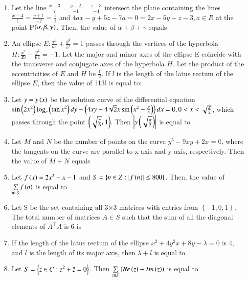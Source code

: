 \documentclass[journal]{IEEEtran}
\begin{document}
\begin{enumerate}
    \item Let the line $\frac{x-3}{7}=\frac{y-2}{-1}=\frac{z-3}{-4}$ intersect the plane containing the lines $\frac{x-4}{1}=\frac{y+1}{-2}=\frac{z}{1}$ and $4ax-y+5z-7a=0=2x-5y-z-3,a\in R$ at the point P$\left(\alpha,\beta,\gamma\right)$. Then, the value of $\alpha+\beta+\gamma$ equals

    \item An ellipse $E:\frac{x^2}{a^2}+\frac{y^2}{b^2}=1$ passes through the vertices of the hyperbola $H:\frac{x^2}{49}-\frac{y^2}{64}=-1$. Let the major and minor axes of the ellipse E coincide with the transverse and conjugate axes of the hyperbola $H$. Let the product of the eccentricities of $E$ and $H$ be $\frac{1}{2}$. If $l$ is the length of the latus rectum of the ellipse $E$, then the value of 113l is equal to:

    \item Let $y=y\left(x\right)$ be the solution curve of the differential equation $\sin\left(2x^2\right)\log_e\left(\tan x^2\right)dy+\left(4xy-4\sqrt{2}x\sin\left(x^2-\frac{\pi}{4}\right)\right)dx=0, 0<x<\sqrt{\frac{\pi}{2}}$, which passes through the point $\left(\sqrt{\frac{\pi}{6}},1\right)$. Then $\left\vert y\left(\sqrt{\frac{\pi}{3}}\right)\right\vert$ is equal to
        
    \item Let $M$ and $N$ be the number of points on the curve $y^5-9xy+2x=0$, where the tangents on the curve are parallel to x-axis and y-axis, respectively. Then the value of $M+N$ equals

    \item Let $f\left(x\right)=2x^2-x-1$ and $S=\left\{ n\in Z:\left\vert f\left(n\right)\right\vert\leq800 \right\}$. Then, the value of $\underset{n\in S}{\sum}f\left(n\right)$ is equal to
        
    \item Let S be the set containing all 3$\times$3 matrices with entries from $\left\{ -1,0,1 \right\}$. The total number of matrices $A\in S$ such that the sum of all the diagonal elements of $A^\top A$ is 6 is

    \item If the length of the latus rectum of the ellipse $x^2+4y^2x+8y-\lambda=0$ is 4, and $l$ is the length of its major axis, then $\lambda+l$ is equal to

    \item Let $S=\left\{ z\in C:z^2+\Bar{z}=0 \right\}$. Then $\underset{z\in S}{\sum}\left(Re\left(z\right)+Im\left(z\right)\right)$ is equal to

\end{enumerate}
\end{document}
